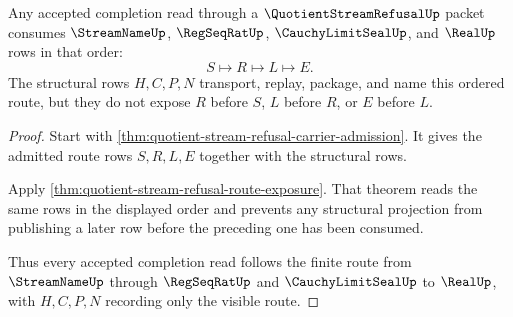 \begin{theorem}
\label{thm:quotient-stream-refusal-route-ordering}
Any accepted completion read through a $\QuotientStreamRefusalUp$ packet consumes $\StreamNameUp$, $\RegSeqRatUp$, $\CauchyLimitSealUp$, and $\RealUp$ rows in that order:
$$
S \longmapsto R \longmapsto L \longmapsto E.
$$
The structural rows $H,C,P,N$ transport, replay, package, and name this ordered route, but they do not expose $R$ before $S$, $L$ before $R$, or $E$ before $L$.
\end{theorem}
\begin{proof}
Start with \autoref{thm:quotient-stream-refusal-carrier-admission}. It gives the admitted route rows $S,R,L,E$ together with the structural rows.

Apply \autoref{thm:quotient-stream-refusal-route-exposure}. That theorem reads the same rows in the displayed order and prevents any structural projection from publishing a later row before the preceding one has been consumed.

Thus every accepted completion read follows the finite route from $\StreamNameUp$ through $\RegSeqRatUp$ and $\CauchyLimitSealUp$ to $\RealUp$, with $H,C,P,N$ recording only the visible route.
\end{proof}

